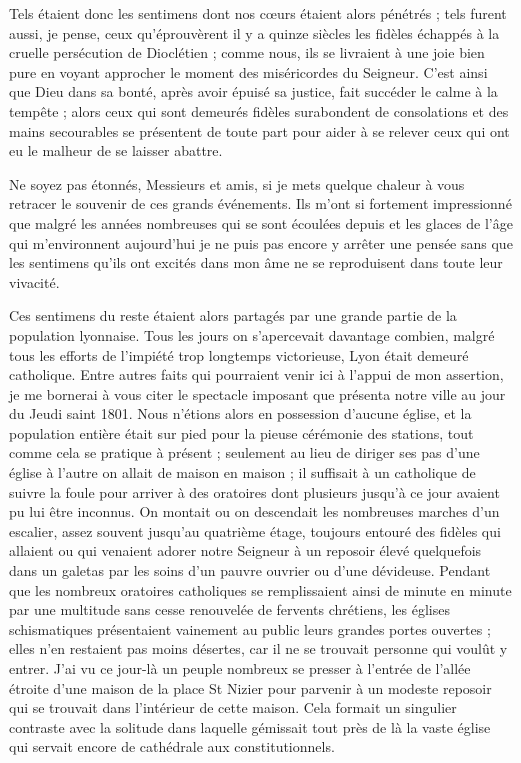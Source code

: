 Tels étaient donc les sentimens dont nos cœurs étaient alors pénétrés ; tels furent aussi, je pense, ceux qu'éprouvèrent il y a quinze siècles les fidèles échappés à la cruelle persécution de Dioclétien ; comme nous, ils se livraient à une joie bien pure en voyant approcher le moment des miséricordes du Seigneur. C'est ainsi que Dieu dans sa bonté, après avoir épuisé sa justice, fait succéder le calme à la tempête ; alors ceux qui sont demeurés fidèles surabondent de consolations et des mains secourables
se présentent de toute part pour aider à se relever ceux qui ont eu le malheur de se laisser abattre.

Ne soyez pas étonnés, Messieurs et amis, si je mets quelque chaleur à vous retracer le souvenir de ces grands événements. Ils m'ont si fortement impressionné que malgré les années nombreuses qui se sont écoulées depuis et les glaces de l'âge qui m'environnent aujourd'hui je ne puis pas encore y arrêter une pensée sans que les sentimens qu'ils ont excités dans mon âme ne se reproduisent dans toute leur vivacité.

Ces sentimens du reste étaient alors partagés par une grande partie de la population lyonnaise. Tous les jours on s'apercevait davantage combien, malgré tous les efforts de l'impiété trop longtemps victorieuse, Lyon était demeuré catholique. Entre autres faits qui pourraient venir ici à l'appui de mon assertion, je me bornerai à vous citer le spectacle imposant que présenta notre ville au jour du Jeudi saint 1801. Nous n'étions alors en possession d'aucune église, et la population entière était sur pied pour la pieuse cérémonie des stations, tout comme cela se pratique à présent ; seulement au lieu de diriger ses pas d'une église à l'autre on allait de maison en maison ; il suffisait à un catholique de suivre la foule pour arriver à des oratoires dont plusieurs jusqu'à ce jour avaient pu lui être inconnus. On montait ou on descendait les nombreuses marches d'un escalier, assez souvent jusqu'au quatrième étage, toujours entouré des
fidèles qui allaient ou qui venaient adorer notre Seigneur à un reposoir élevé quelquefois dans un galetas par les soins d'un pauvre ouvrier ou d'une dévideuse. Pendant que les nombreux oratoires catholiques se remplissaient ainsi de minute en minute par une multitude sans cesse renouvelée de fervents chrétiens, les églises schismatiques présentaient vainement au public leurs grandes portes ouvertes ; elles n'en restaient pas moins désertes, car il ne se trouvait personne qui voulût y entrer. J'ai vu ce jour-là un peuple nombreux se presser à l'entrée de l'allée étroite d'une maison de la place St Nizier pour parvenir à un modeste reposoir qui se trouvait dans l'intérieur de cette maison. Cela formait un singulier contraste avec la solitude dans laquelle gémissait tout près de là la vaste église qui servait encore de cathédrale aux constitutionnels.

